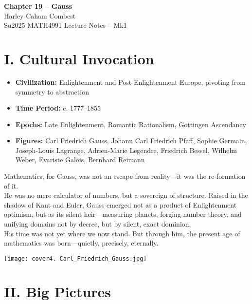 \documentclass[9pt]{article}
\begin{document}
\begin{center}
\Large\textbf{Chapter 19 – Gauss} \\
\large Harley Caham Combest \\
\large Su2025 MATH4991 Lecture Notes – Mk1
\end{center}

\vspace{1em}

\section*{I. Cultural Invocation}

\begin{itemize}
  \item \textbf{Civilization:} Enlightenment and Post-Enlightenment Europe, pivoting from symmetry to abstraction
  \item \textbf{Time Period:} c. 1777–1855
  \item \textbf{Epochs:} Late Enlightenment, Romantic Rationalism, Göttingen Ascendancy
  \item \textbf{Figures:} Carl Friedrich Gauss, Johann Carl Friedrich Pfaff, Sophie Germain, Joseph-Louis Lagrange, Adrien-Marie Legendre, Friedrich Bessel, Wilhelm Weber, Evariste Galois, Bernhard Reimann
\end{itemize}

\noindent
Mathematics, for Gauss, was not an escape from reality—it was the re-formation of it.  \\

\noindent
He was no mere calculator of numbers, but a sovereign of structure. Raised in the shadow of Kant and Euler, Gauss emerged not as a product of Enlightenment optimism, but as its silent heir—measuring planets, forging number theory, and unifying domains not by decree, but by silent, exact dominion.\\

\noindent
His time was not yet where we now stand. But through him, the present age of mathematics was born—quietly, precisely, eternally.

\vspace{1em}

\begin{center}
    \texttt{[image: cover4. Carl\_Friedrich\_Gauss.jpg]}
\end{center}

\newpage

\section*{II. Big Pictures}
\end{document}
